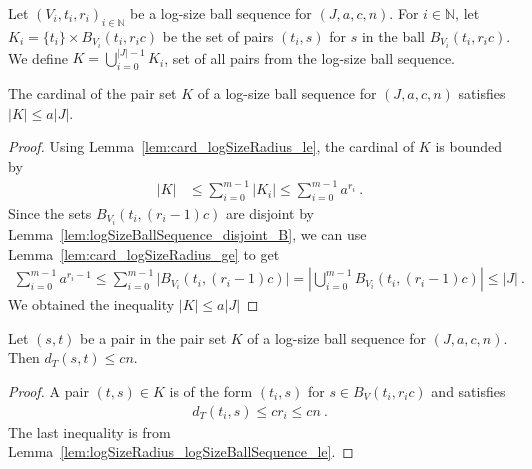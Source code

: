 \begin{definition}\label{def:pairSet}
  \mathlibok
Let $(V_i, t_i, r_i)_{i \in \mathbb{N}}$ be a log-size ball sequence for $(J, a, c, n)$.
For $i \in \mathbb{N}$, let $K_i = \{t_i\} \times B_{V_i}(t_i, r_i c)$ be the set of pairs $(t_i, s)$ for $s$ in the ball $B_{V_i}(t_i, r_i c)$.
We define $K = \bigcup_{i=0}^{\vert J \vert-1} K_i$, set of all pairs from the log-size ball sequence.
\end{definition}


\begin{lemma}\label{lem:card_pairSet_le}
  \mathlibok
The cardinal of the pair set $K$ of a log-size ball sequence for $(J, a, c, n)$ satisfies $|K| \le a |J|$.
\end{lemma}

\begin{proof}
  \leanok
Using Lemma~\ref{lem:card_logSizeRadius_le}, the cardinal of $K$ is bounded by
\begin{align*}
  \vert K \vert
  &\le \sum_{i=0}^{m-1} \vert K_i \vert
  \le \sum_{i=0}^{m-1} a^{r_i}
  \: .
\end{align*}
Since the sets $B_{V_i}(t_i, (r_i-1)c)$ are disjoint by Lemma~\ref{lem:logSizeBallSequence_disjoint_B}, we can use Lemma~\ref{lem:card_logSizeRadius_ge} to get
\begin{align*}
  \sum_{i=0}^{m-1} a^{r_i - 1}
  \le \sum_{i=0}^{m-1} \vert B_{V_i}(t_i, (r_i-1)c) \vert
  = \left\vert \bigcup_{i=0}^{m-1} B_{V_i}(t_i, (r_i-1)c) \right\vert
  \le \vert J \vert
  \: .
\end{align*}
We obtained the inequality $\vert K \vert \le a \vert J \vert$
\end{proof}


\begin{lemma}\label{lem:dist_le_of_mem_pairSet}
  \mathlibok
Let $(s, t)$ be a pair in the pair set $K$ of a log-size ball sequence for $(J, a, c, n)$.
Then $d_T(s, t) \le c n$.
\end{lemma}

\begin{proof}
  \leanok
A pair $(t, s) \in K$ is of the form $(t_i, s)$ for $s \in B_V(t_i, r_i c)$ and satisfies
\begin{align*}
  d_T(t_i, s) \le c r_i \le c n \: .
\end{align*}
The last inequality is from Lemma~\ref{lem:logSizeRadius_logSizeBallSequence_le}.
\end{proof}


